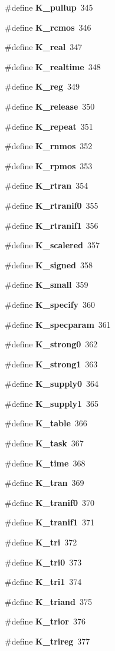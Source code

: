 \begin{CompactItemize}
\item 
\#define {\bf K\_\-pullup}\ 345
\item 
\#define {\bf K\_\-rcmos}\ 346
\item 
\#define {\bf K\_\-real}\ 347
\item 
\#define {\bf K\_\-realtime}\ 348
\item 
\#define {\bf K\_\-reg}\ 349
\item 
\#define {\bf K\_\-release}\ 350
\item 
\#define {\bf K\_\-repeat}\ 351
\item 
\#define {\bf K\_\-rnmos}\ 352
\item 
\#define {\bf K\_\-rpmos}\ 353
\item 
\#define {\bf K\_\-rtran}\ 354
\item 
\#define {\bf K\_\-rtranif0}\ 355
\item 
\#define {\bf K\_\-rtranif1}\ 356
\item 
\#define {\bf K\_\-scalered}\ 357
\item 
\#define {\bf K\_\-signed}\ 358
\item 
\#define {\bf K\_\-small}\ 359
\item 
\#define {\bf K\_\-specify}\ 360
\item 
\#define {\bf K\_\-specparam}\ 361
\item 
\#define {\bf K\_\-strong0}\ 362
\item 
\#define {\bf K\_\-strong1}\ 363
\item 
\#define {\bf K\_\-supply0}\ 364
\item 
\#define {\bf K\_\-supply1}\ 365
\item 
\#define {\bf K\_\-table}\ 366
\item 
\#define {\bf K\_\-task}\ 367
\item 
\#define {\bf K\_\-time}\ 368
\item 
\#define {\bf K\_\-tran}\ 369
\item 
\#define {\bf K\_\-tranif0}\ 370
\item 
\#define {\bf K\_\-tranif1}\ 371
\item 
\#define {\bf K\_\-tri}\ 372
\item 
\#define {\bf K\_\-tri0}\ 373
\item 
\#define {\bf K\_\-tri1}\ 374
\item 
\#define {\bf K\_\-triand}\ 375
\item 
\#define {\bf K\_\-trior}\ 376
\item 
\#define {\bf K\_\-trireg}\ 377

\end{CompactItemize}
